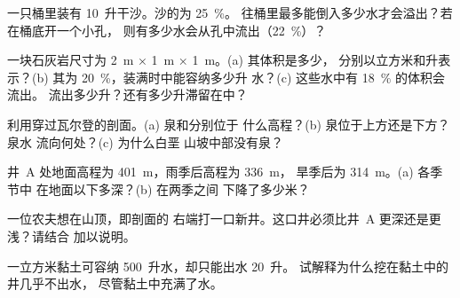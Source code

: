 \begin{exercise}[$\star\star$]\label{exo:g6:water-underground:5}
一只桶里装有 10~升干沙。沙的为 25~\%。
往桶里最多能倒入多少水才会溢出？若在桶底开一个小孔，
则有多少水会从孔中流出（22~\%）？
\end{exercise}

\begin{exercise}[$\star\star$]\label{exo:g6:water-underground:6}
一块石灰岩尺寸为 2~m × 1~m × 1~m。(a) 其体积是多少，
分别以立方米和升表示？(b) 其为 20~\%，装满时中能容纳多少升
水？(c) 这些水中有 18~\% 的体积会流出。
流出多少升？还有多少升滞留在中？
\end{exercise}

\begin{exercise}[$\star\star$]\label{exo:g6:water-underground:7}
利用穿过瓦尔登的剖面。(a) 泉和分别位于
什么高程？(b) 泉位于上方还是下方？泉水
流向何处？(c) 为什么白垩
山坡中部没有泉？
\end{exercise}

\begin{exercise}[$\star\star$]\label{exo:g6:water-underground:8}
井~A 处地面高程为 401~m，雨季后高程为 336~m，
旱季后为 314~m。(a) 各季节中
在地面以下多深？(b) 在两季之间
下降了多少米？
\end{exercise}

\begin{exercise}[$\star\star$]\label{exo:g6:water-underground:9}
一位农夫想在山顶，即剖面的
右端打一口新井。这口井必须比井~A 更深还是更浅？请结合
加以说明。
\end{exercise}

\begin{exercise}[$\star\star$]\label{exo:g6:water-underground:10}
一立方米黏土可容纳 500~升水，却只能出水 20~升。
试解释为什么挖在黏土中的井几乎不出水，
尽管黏土中充满了水。
\end{exercise}

